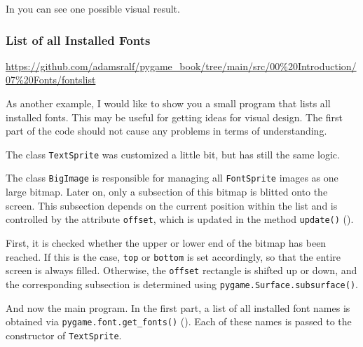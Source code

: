 In  you can see one possible visual result.

\subsubsection{List of all Installed Fonts}\label{secFontInstalled}
\begin{diskbox}
	\url{https://github.com/adamsralf/pygame_book/tree/main/src/00%20Introduction/07%20Fonts/fontslist}
\end{diskbox}
As another example, I would like to show you a small program that lists all installed fonts. This may be useful for getting ideas for visual design. The first part of the code should not cause any problems in terms of understanding.


\newpage
{} 

The class \texttt{TextSprite} was customized a little bit, but has still the same logic. 


The class \texttt{BigImage} is responsible for managing all \texttt{FontSprite} images as one large bitmap. Later on, only a subsection of this bitmap is blitted onto the screen. This subsection depends on the current position within the list and is controlled by the attribute \texttt{offset}, which is updated in the method \texttt{update()} ().

First, it is checked whether the upper or lower end of the bitmap has been reached. If this is the case, \texttt{top} or \texttt{bottom} is set accordingly, so that the entire screen is always filled. Otherwise, the \texttt{offset} rectangle is shifted up or down, and the corresponding subsection is determined using \texttt{pygame.Surface.subsurface()}.



And now the main program. In the first part, a list of all installed font names is obtained via \texttt{pygame.font.get\_fonts()} (). Each of these names is passed to the constructor of \texttt{TextSprite}.

